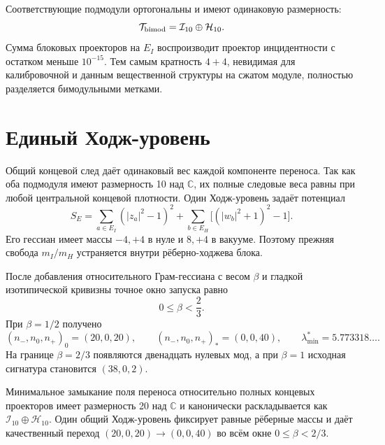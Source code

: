 Соответствующие подмодули ортогональны и имеют одинаковую размерность:
\begin{equation}
 \mathcal T_{\rm bimod}=\mathcal I_{10}\oplus\mathcal H_{10}.
 \label{eq:v8-bimodule-ten-plus-ten}
\end{equation}
Сумма блоковых проекторов на $E_I$ воспроизводит проектор инцидентности с
остатком меньше $10^{-15}$. Тем самым кратность $4+4$, невидимая для калибровочной и
данным вещественной структуры на сжатом модуле, полностью разделяется бимодульными метками.

\section{Единый Ходж-уровень}

Общий концевой след даёт одинаковый вес каждой компоненте переноса. Так как
оба подмодуля имеют размерность 10 над $\mathbb C$, их полные следовые веса
равны при любой центральной концевой плотности. Один Ходж-уровень задаёт
потенциал
\begin{equation}
 S_E=\sum_{a\in E_I}(|z_a|^2-1)^2
 +\sum_{b\in E_H}\bigl[(|w_b|^2+1)^2-1\bigr].
 \label{eq:v8-bimodule-common-level-potential}
\end{equation}
Его гессиан имеет массы $-4,+4$ в нуле и $8,+4$ в вакууме. Поэтому прежняя
свобода $m_I/m_H$ устраняется внутри рёберно-ходжева блока.

После добавления относительного Грам-гессиана с весом $\beta$ и гладкой
изотипической кривизны точное окно запуска равно
\begin{equation}
 0\leq\beta<\frac23.
 \label{eq:v8-bimodule-beta-window}
\end{equation}
При $\beta=1/2$ получено
\begin{equation}
 (n_-,n_0,n_+)_{0}=(20,0,20),
 \qquad
 (n_-,n_0,n_+)_{*}=(0,0,40),
 \qquad
 \lambda_{\min}^{*}=5.773318\ldots.
 \label{eq:v8-bimodule-full-transition}
\end{equation}
На границе $\beta=2/3$ появляются двенадцать нулевых мод, а при $\beta=1$
исходная сигнатура становится $(38,0,2)$.

\begin{theorem}
Минимальное замыкание поля переноса относительно полных концевых проекторов
имеет размерность 20 над $\mathbb C$ и канонически раскладывается как
$\mathcal I_{10}\oplus\mathcal H_{10}$. Один общий Ходж-уровень фиксирует
равные рёберные массы и даёт качественный переход
$(20,0,20)\to(0,0,40)$ во всём окне $0\leq\beta<2/3$.
\end{theorem}

